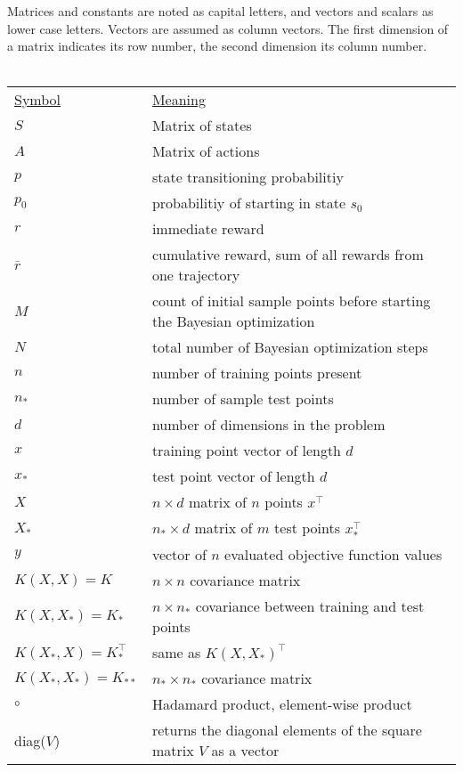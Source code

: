 Matrices and constants are noted as capital letters, and vectors and scalars as lower case letters. Vectors are assumed as column vectors. The first dimension of a matrix indicates its row number, the second dimension its column number.\\
\\
\begin{tabular}{l l}
    \underline{Symbol} & \underline{Meaning}\\
    $S$ & Matrix of states\\
    $A$ & Matrix of actions\\
    $p$ & state transitioning probabilitiy\\
    $p_0$ & probabilitiy of starting in state $s_0$\\
    $r$ & immediate reward\\
    $\bar{r}$ & cumulative reward, sum of all rewards from one trajectory\\
    $M$ & count of initial sample points before starting the Bayesian optimization\\
    $N$ & total number of Bayesian optimization steps\\
    $n$ & number of training points present\\
    $n_*$ & number of sample test points\\
    $d$ & number of dimensions in the problem\\
    $x$ & training point vector of length $d$\\
    $x_*$ & test point vector of length $d$\\
    $X$ & $n \times d$ matrix of $n$ points $x^{\top}$\\
    $X_*$ & $n_* \times d$ matrix of $m$ test points $x^{\top}_*$\\
    $y$ & vector of $n$ evaluated objective function values\\
    $K(X,X) = K$ & $n \times n$ covariance matrix\\
    $K(X,X_*) = K_*$ & $n \times n_*$ covariance between training and test points\\
    $K(X_*,X) = K_*^\top$ & same as $K(X,X_*)^{\top}$\\
    $K(X_*,X_*) = K_{**}$ & $n_* \times n_*$ covariance matrix\\
    $\circ$ & Hadamard product, element-wise product\\
    diag($V$) & returns the diagonal elements of the square matrix $V$ as a vector\\
\end{tabular}
